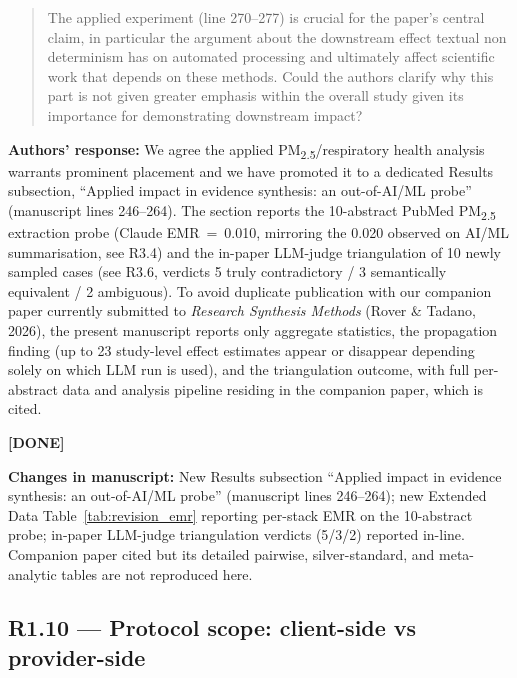 \documentclass[11pt,a4paper]{article}
\newenvironment{revquote}{%
  \begin{quote}\small\itshape\color{revgray}
}{%
  \end{quote}
}
\newcommand{\response}[1]{\par\noindent\textbf{\color{revgreen}Authors' response:} #1\par}
\newcommand{\changes}[1]{\par\noindent\textbf{\color{revblue}Changes in manuscript:} #1\par}
\newcommand{\done}{\color{revgreen}\textbf{[DONE]}}
\begin{document}
\begin{revquote}
The applied experiment (line 270--277) is crucial for the paper's central claim, in particular the argument about the downstream effect textual non determinism has on automated processing and ultimately affect scientific work that depends on these methods. Could the authors clarify why this part is not given greater emphasis within the overall study given its importance for demonstrating downstream impact?
\end{revquote}

\response{We agree the applied PM\textsubscript{2.5}/respiratory health analysis warrants prominent placement and we have promoted it to a dedicated Results subsection, ``Applied impact in evidence synthesis: an out-of-AI/ML probe'' (manuscript lines 246--264). The section reports the 10-abstract PubMed PM\textsubscript{2.5} extraction probe (Claude EMR~=~0.010, mirroring the 0.020 observed on AI/ML summarisation, see R3.4) and the in-paper LLM-judge triangulation of 10 newly sampled cases (see R3.6, verdicts 5 truly contradictory / 3 semantically equivalent / 2 ambiguous). To avoid duplicate publication with our companion paper currently submitted to \emph{Research Synthesis Methods} (Rover \& Tadano, 2026), the present manuscript reports only aggregate statistics, the propagation finding (up to 23 study-level effect estimates appear or disappear depending solely on which LLM run is used), and the triangulation outcome, with full per-abstract data and analysis pipeline residing in the companion paper, which is cited.} \done

\changes{New Results subsection ``Applied impact in evidence synthesis: an out-of-AI/ML probe'' (manuscript lines 246--264); new Extended Data Table~\ref{tab:revision_emr} reporting per-stack EMR on the 10-abstract probe; in-paper LLM-judge triangulation verdicts (5/3/2) reported in-line. Companion paper cited but its detailed pairwise, silver-standard, and meta-analytic tables are not reproduced here.}

\subsection*{R1.10 --- Protocol scope: client-side vs provider-side}
\end{document}
